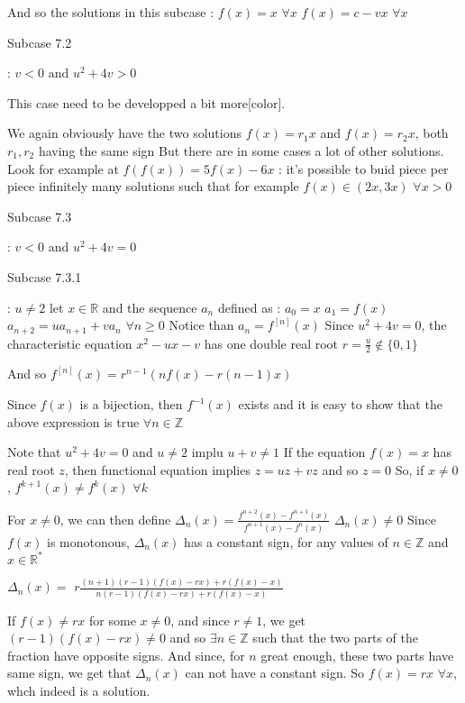 \begin{solution}
\begin{tcolorbox}
And so the solutions in this subcase :
$f(x)=x$ $\forall x$
$f(x)=c-vx$ $\forall x$

\begin{bolded}Subcase 7.2\end{bolded} : $v<0$ and $u^2+4v>0$
\begin{bolded}[color=red]This case need to be developped a bit more[\/color].\end{bolded}
We again obviously have the two solutions $f(x)=r_1x$ and $f(x)=r_2x$, both $r_1,r_2$ having the same sign
But there are in some cases a lot of other solutions.
Look for example at $f(f(x))=5f(x)-6x$ : it's possible to buid piece per piece infinitely many solutions such that for example $f(x)\in(2x,3x)$ $\forall x>0$


\begin{bolded}Subcase 7.3 \end{bolded}: $v<0$ and $u^2+4v=0$
\begin{bolded}Subcase 7.3.1\end{bolded} : $u\ne 2$
let $x\in\mathbb R$ and the sequence $a_n$ defined as :
$a_0=x$
$a_1=f(x)$
$a_{n+2}=ua_{n+1}+va_n$ $\forall n\ge 0$
Notice than $a_n=f^{[n]}(x)$
Since $u^2+4v=0$, the characteristic equation $x^2-ux-v$ has one double real root $r=\frac u2\notin\{0,1\}$

And so $f^{[n]}(x)=r^{n-1}(nf(x)-r(n-1)x)$

Since $f(x)$ is a bijection, then $f^{-1}(x)$ exists and it is easy to show that the above expression is true $\forall n\in\mathbb Z$

Note that $u^2+4v=0$ and $u\ne 2$ implu $u+v\ne 1$
If the equation $f(x)=x$ has real root $z$, then functional equation implies $z=uz+vz$ and so $z=0$
So, if $x\ne 0$, $f^{k+1}(x)\ne f^k(x)$ $\forall k$

For $x\ne 0$, we can then define $\Delta_n(x)=\frac{f^{n+2}(x)-f^{n+1}(x)}{f^{n+1}(x)-f^{n}(x)}$
$\Delta_n(x)\ne 0$
Since $f(x)$ is monotonous, $\Delta_n(x)$ has a constant sign, for any values of $n\in\mathbb Z$ and $x\in\mathbb R^*$

$\Delta_n(x)=$ $r\frac{(n+1)(r-1)(f(x)-rx)+r(f(x)-x)}{n(r-1)(f(x)-rx)+r(f(x)-x)}$

If $f(x)\ne rx$ for some $x\ne 0$, and since $r\ne 1$, we get $(r-1)(f(x)-rx)\ne 0$ and so $\exists n\in\mathbb Z$ such that the two parts of the fraction have opposite signs.
And since, for $n$ great enough, these two parts have same sign, we get that $\Delta_n(x)$ can not have a constant sign.
So $f(x)=rx$ $\forall x$, whch indeed is a solution.


\end{tcolorbox}
\end{solution}
